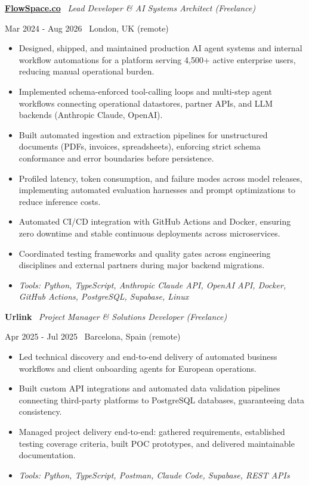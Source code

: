 \documentclass[a4paper,10pt]{article}
\newcommand{\role}[4]{%
 \vspace{2pt}\noindent
 \begin{minipage}[t]{0.70\textwidth}\raggedright\textbf{#1} \textbullet\ \textit{#3}\end{minipage}%
 \hfill
 \begin{minipage}[t]{0.28\textwidth}\raggedleft\footnotesize\color{gray}#2 \textbullet\ #4\end{minipage}%
 \vspace{1pt}%
}
\begin{document}
\role{\href{https://flowspace.co}{FlowSpace.co}}{Mar 2024 - Aug 2026}{Lead Developer \& AI Systems Architect (Freelance)}{London, UK (remote)}
\begin{itemize}
 \item Designed, shipped, and maintained production AI agent systems and internal workflow automations for a platform serving 4,500+ active enterprise users, reducing manual operational burden.
 \item Implemented schema-enforced tool-calling loops and multi-step agent workflows connecting operational datastores, partner APIs, and LLM backends (Anthropic Claude, OpenAI).
 \item Built automated ingestion and extraction pipelines for unstructured documents (PDFs, invoices, spreadsheets), enforcing strict schema conformance and error boundaries before persistence.
 \item Profiled latency, token consumption, and failure modes across model releases, implementing automated evaluation harnesses and prompt optimizations to reduce inference costs.
 \item Automated CI/CD integration with GitHub Actions and Docker, ensuring zero downtime and stable continuous deployments across microservices.
 \item Coordinated testing frameworks and quality gates across engineering disciplines and external partners during major backend migrations.
 \item \textit{Tools: Python, TypeScript, Anthropic Claude API, OpenAI API, Docker, GitHub Actions, PostgreSQL, Supabase, Linux}
\end{itemize}

\role{Urlink}{Apr 2025 - Jul 2025}{Project Manager \& Solutions Developer (Freelance)}{Barcelona, Spain (remote)}
\begin{itemize}
 \item Led technical discovery and end-to-end delivery of automated business workflows and client onboarding agents for European operations.
 \item Built custom API integrations and automated data validation pipelines connecting third-party platforms to PostgreSQL databases, guaranteeing data consistency.
 \item Managed project delivery end-to-end: gathered requirements, established testing coverage criteria, built POC prototypes, and delivered maintainable documentation.
 \item \textit{Tools: Python, TypeScript, Postman, Claude Code, Supabase, REST APIs}
\end{itemize}
\end{document}
